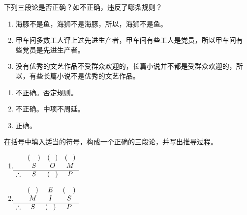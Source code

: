 \documentclass{ctexart}
\begin{document}
\begin{problem}\label{pro:6}
  下列三段论是否正确？如不正确，违反了哪条规则？
  \begin{enumerate}
    \item 海豚不是鱼，海狮不是海豚，所以，海狮不是鱼。
    \item 甲车间多数工人评上过先进生产者，甲车间有些工人是党员，所以甲车间有
      些党员是先进生产者。
    \item 没有优秀的文艺作品不受群众欢迎的，长篇小说并不都是受群众欢迎的，所
      以，有些长篇小说不是优秀的文艺作品。
  \end{enumerate}
\end{problem}
\begin{solution}
  \begin{enumerate}
    \item 不正确。否定规则。
    \item 不正确。中项不周延。
    \item 正确。
  \end{enumerate}
\end{solution}
\begin{problem}\label{pro:7}
  在括号中填入适当的符号，构成一个正确的三段论，并写出推导过程。
  \begin{enumerate}
    \item \(\begin{matrix}
                   & (\textcolor{white}{M}) & (\textcolor{white}{A}) & (\textcolor{white}{P}) \\
                   & S                      & O                      & M                      \\
        \hline
        \therefore & S                      & (\textcolor{white}{O}) & P                      \\

      \end{matrix}\)
    \item \(\begin{matrix}
                   & (\textcolor{white}{P}) & E                      & (\textcolor{white}{M}) \\
                   & M                      & I                      & S                      \\
        \hline
        \therefore & S                      & (\textcolor{white}{O}) & P                      \\

      \end{matrix}\)
  \end{enumerate}

\end{problem}
\end{document}
